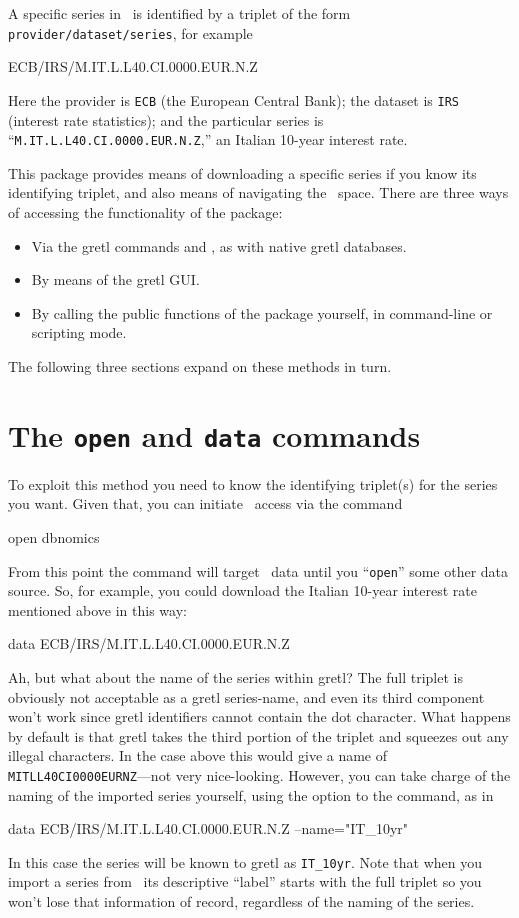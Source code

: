 \documentclass{article}
\begin{document}
A specific series in \DB\ is identified by a triplet
of the form \texttt{provider/dataset/series}, for example
\begin{code}
ECB/IRS/M.IT.L.L40.CI.0000.EUR.N.Z
\end{code}
Here the provider is \texttt{ECB} (the European Central Bank); the
dataset is \texttt{IRS} (interest rate statistics); and the particular
series is ``\texttt{M.IT.L.L40.CI.0000.EUR.N.Z},'' an Italian 10-year
interest rate.

This package provides means of downloading a specific series if you
know its identifying triplet, and also means of navigating the
\DB\ space. There are three ways of accessing the
functionality of the package:
\begin{itemize}
\item Via the gretl commands  and , as with native
  gretl databases.
\item By means of the gretl GUI.
\item By calling the public functions of the package yourself, in
  command-line or scripting mode.
\end{itemize}
The following three sections expand on these methods in turn.

\section{The \texttt{open} and \texttt{data} commands}
\label{sec:open-data}

To exploit this method you need to know the identifying triplet(s) for
the series you want. Given that, you can initiate \DB\ 
access via the command
\begin{code}
open dbnomics
\end{code}
From this point the  command will target \DB\ 
data until you ``\texttt{open}'' some other data source. So, for
example, you could download the Italian 10-year interest rate
mentioned above in this way:
\begin{code}
data ECB/IRS/M.IT.L.L40.CI.0000.EUR.N.Z
\end{code}

Ah, but what about the name of the series within gretl? The full
triplet is obviously not acceptable as a gretl series-name, and even
its third component won't work since gretl identifiers cannot contain
the dot character. What happens by default is that gretl takes the
third portion of the triplet and squeezes out any illegal characters.
In the case above this would give a name of
\texttt{MITLL40CI0000EURNZ}---not very nice-looking. However, you can
take charge of the naming of the imported series yourself, using the
\option{name} option to the \cmd{data} command, as in
\begin{code}
data ECB/IRS/M.IT.L.L40.CI.0000.EUR.N.Z --name="IT_10yr"
\end{code}
In this case the series will be known to gretl as \texttt{IT\_10yr}.
Note that when you import a series from \DB\ its
descriptive ``label'' starts with the full triplet so you won't lose
that information of record, regardless of the naming of the series.
\end{document}
